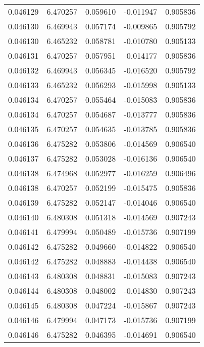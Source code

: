 \begin{tabular}{lrrrr}
0.046129    &  6.470257 &  0.059610 & -0.011947 &             0.905836 \\
0.046130    &  6.469943 &  0.057174 & -0.009865 &             0.905792 \\
0.046130    &  6.465232 &  0.058781 & -0.010780 &             0.905133 \\
0.046131    &  6.470257 &  0.057951 & -0.014177 &             0.905836 \\
0.046132    &  6.469943 &  0.056345 & -0.016520 &             0.905792 \\
0.046133    &  6.465232 &  0.056293 & -0.015998 &             0.905133 \\
0.046134    &  6.470257 &  0.055464 & -0.015083 &             0.905836 \\
0.046134    &  6.470257 &  0.054687 & -0.013777 &             0.905836 \\
0.046135    &  6.470257 &  0.054635 & -0.013785 &             0.905836 \\
0.046136    &  6.475282 &  0.053806 & -0.014569 &             0.906540 \\
0.046137    &  6.475282 &  0.053028 & -0.016136 &             0.906540 \\
0.046138    &  6.474968 &  0.052977 & -0.016259 &             0.906496 \\
0.046138    &  6.470257 &  0.052199 & -0.015475 &             0.905836 \\
0.046139    &  6.475282 &  0.052147 & -0.014046 &             0.906540 \\
0.046140    &  6.480308 &  0.051318 & -0.014569 &             0.907243 \\
0.046141    &  6.479994 &  0.050489 & -0.015736 &             0.907199 \\
0.046142    &  6.475282 &  0.049660 & -0.014822 &             0.906540 \\
0.046142    &  6.475282 &  0.048883 & -0.014438 &             0.906540 \\
0.046143    &  6.480308 &  0.048831 & -0.015083 &             0.907243 \\
0.046144    &  6.480308 &  0.048002 & -0.014830 &             0.907243 \\
0.046145    &  6.480308 &  0.047224 & -0.015867 &             0.907243 \\
0.046146    &  6.479994 &  0.047173 & -0.015736 &             0.907199 \\
0.046146    &  6.475282 &  0.046395 & -0.014691 &             0.906540 \\

\end{tabular}
